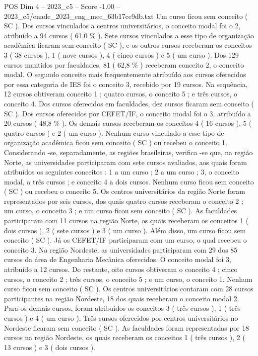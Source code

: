 \begin{textsample}{POS Dim 4 – 2023\_c5 – Score -1.00 – 2023\_c5/enade\_2023\_eng\_mec\_63b17ce9db.txt}
Um curso ficou sem conceito ( SC ).
Dos cursos vinculados a centros universitários, o conceito modal foi o 2, atribuído a 94 cursos ( 61,0 \% ).
Sete cursos vinculados a esse tipo de organização acadêmica ficaram sem conceito ( SC ), e os outros cursos receberam os conceitos 3 ( 38 cursos ), 1 ( nove cursos ), 4 ( cinco cursos ) e 5 ( um curso ).
Dos 129 cursos mantidos por faculdades, 81 ( 62,8 \% ) receberam conceito 2, o conceito modal.
O segundo conceito mais frequentemente atribuído aos cursos oferecidos por essa categoria de IES foi o conceito 3, recebido por 19 cursos.
Na sequência, 12 cursos obtiveram conceito 1 ; quatro cursos, o conceito 5 ; e três cursos, o conceito 4.
Dos cursos oferecidos em faculdades, dez cursos ficaram sem conceito ( SC ).
Dos cursos oferecidos por CEFET/IF, o conceito modal foi o 3, atribuído a 20 cursos ( 48,8 \% ).
Os demais cursos receberam os conceitos 4 ( 16 cursos ), 5 ( quatro cursos ) e 2 ( um curso ).
Nenhum curso vinculado a esse tipo de organização acadêmica ficou sem conceito ( SC ) ou recebeu o conceito 1.
Considerando -se, separadamente, as regiões brasileiras, verifica -se que, na região Norte, as universidades participaram com sete cursos avaliados, aos quais foram atribuídos os seguintes conceitos : 1 a um curso ; 2 a um curso ; 3, o conceito modal, a três cursos ; e conceito 4 a dois cursos.
Nenhum curso ficou sem conceito ( SC ) ou recebeu o conceito 5.
Os centros universitários da região Norte foram representados por seis cursos, dos quais quatro cursos receberam o conceito 2 ; um curso, o conceito 3 ; e um curso ficou sem conceito ( SC ).
As faculdades participaram com 11 cursos na região Norte, os quais receberam os conceitos 1 ( dois cursos ), 2 ( sete cursos ) e 3 ( um curso ).
Além disso, um curso ficou sem conceito ( SC ).
Já os CEFET/IF participaram com um curso, o qual recebeu o conceito 3.
Na região Nordeste, as universidades participaram com 29 dos 85 cursos da área de Engenharia Mecânica oferecidos.
O conceito modal foi 3, atribuído a 12 cursos.
Do restante, oito cursos obtiveram o conceito 4 ; cinco cursos, o conceito 2 ; três cursos, o conceito 5 ; e um curso, o conceito 1.
Nenhum curso ficou sem conceito ( SC ).
Os centros universitários contaram com 28 cursos participantes na região Nordeste, 18 dos quais receberam o conceito modal 2.
Para os demais cursos, foram atribuídos os conceitos 3 ( três cursos ), 1 ( três cursos ) e 4 ( um curso ).
Três cursos oferecidos por centros universitários no Nordeste ficaram sem conceito ( SC ).
As faculdades foram representadas por 18 cursos na região Nordeste, os quais receberam os conceitos 1 ( três cursos ), 2 ( 13 cursos ) e 3 ( dois cursos ).

\end{textsample}
